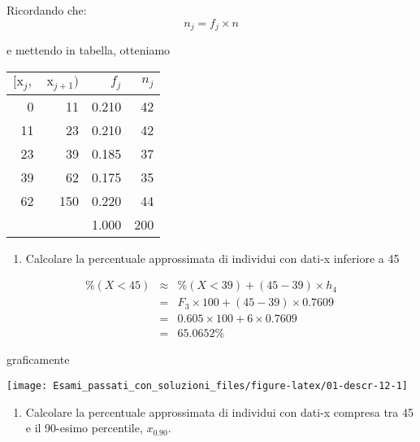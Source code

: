 \documentclass[
  11pt,
]{book}
\providecommand{\tightlist}{%
  \setlength{\itemsep}{0pt}\setlength{\parskip}{0pt}}
\theoremstyle{mytheoremstyle}
\theoremstyle{mydefstyle}
\newenvironment{sol}
  {
  \begin{tcolorbox}[enhanced,breakable,arc=0.1mm,boxrule=1pt,colback=white,colframe=iblue,
  title=\bf \fontfamily{lmss}\selectfont \hspace{.5 cm} Soluzione,drop fuzzy shadow]

}{
\end{tcolorbox}
  }
\begin{document}
\begin{sol}

Ricordando che:
\[
n_j=f_j\times n
\]

e mettendo in tabella, otteniamo

\begin{table}[H]
\centering
\begin{tabular}{rrrr}
\toprule
$[\text{x}_j,$ & $\text{x}_{j+1})$ & $f_j$ & $n_j$\\
\midrule
0 & 11 & 0.210 & 42\\
11 & 23 & 0.210 & 42\\
23 & 39 & 0.185 & 37\\
39 & 62 & 0.175 & 35\\
62 & 150 & 0.220 & 44\\
 &  & 1.000 & 200\\
\bottomrule
\end{tabular}
\end{table}

\end{sol}

\begin{enumerate}
\def\labelenumi{\alph{enumi}.}
\setcounter{enumi}{2}
\tightlist
\item
  Calcolare la percentuale approssimata di individui con dati-x inferiore a 45
\end{enumerate}

\begin{sol}

\begin{eqnarray*}
\%(X<45)   &\approx&  \%(X<39)+(45-39)\times h_4\\
&=& F_3\times 100+(45-39)\times 0.7609\\
&=& 0.605\times 100 + 6\times 0.7609\\
&=& 65.0652\%
\end{eqnarray*}

graficamente

\begin{center}\texttt{[image: Esami\_passati\_con\_soluzioni\_files/figure-latex/01-descr-12-1]} \end{center}

\end{sol}

\begin{enumerate}
\def\labelenumi{\alph{enumi}.}
\setcounter{enumi}{3}
\tightlist
\item
  Calcolare la percentuale approssimata di individui con dati-x compresa tra 45 e il 90-esimo percentile, \(x_{0.90}\).
\end{enumerate}
\end{document}
